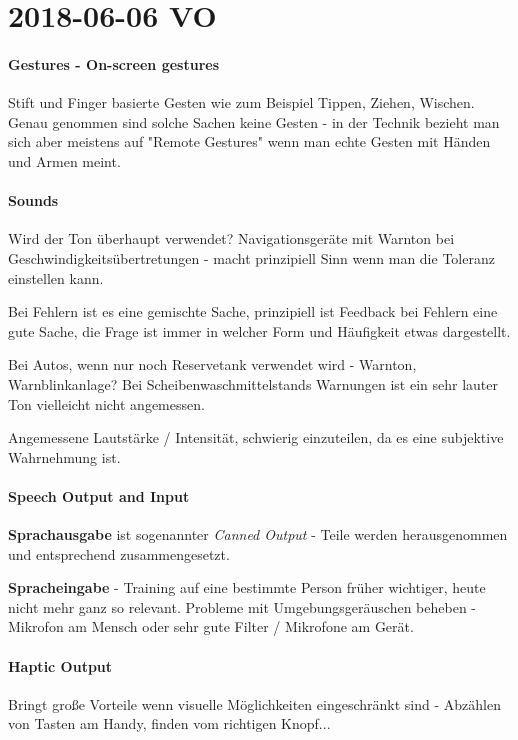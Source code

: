 \section{2018-06-06 VO}

\paragraph{Gestures - On-screen gestures}

Stift und Finger basierte Gesten wie zum Beispiel Tippen, Ziehen, Wischen. 
Genau genommen sind solche Sachen keine Gesten - in der Technik bezieht man sich 
aber meistens auf "Remote Gestures" wenn man echte Gesten mit Händen und Armen meint.

\paragraph{Sounds}
Wird der Ton überhaupt verwendet? Navigationsgeräte mit Warnton bei
Geschwindigkeitsübertretungen - macht prinzipiell Sinn wenn man die Toleranz einstellen
kann.

Bei Fehlern ist es eine gemischte Sache, prinzipiell ist Feedback bei Fehlern eine gute
Sache, die Frage ist immer in welcher Form und Häufigkeit etwas dargestellt. 

Bei Autos, wenn nur noch Reservetank verwendet wird - Warnton, Warnblinkanlage?
Bei Scheibenwaschmittelstands Warnungen ist ein sehr lauter Ton vielleicht nicht
angemessen.

Angemessene Lautstärke / Intensität, schwierig einzuteilen, da es eine subjektive
Wahrnehmung ist.

\paragraph{Speech Output and Input}

\textbf{Sprachausgabe} ist sogenannter \textit{Canned Output} - Teile werden herausgenommen
und entsprechend zusammengesetzt. 

\textbf{Spracheingabe} - Training auf eine bestimmte Person früher wichtiger, heute nicht mehr
ganz so relevant. Probleme mit Umgebungsgeräuschen beheben - Mikrofon am Mensch oder 
sehr gute Filter / Mikrofone am Gerät.

\paragraph{Haptic Output}

Bringt große Vorteile wenn visuelle Möglichkeiten eingeschränkt sind - Abzählen von 
Tasten am Handy, finden vom richtigen Knopf...

